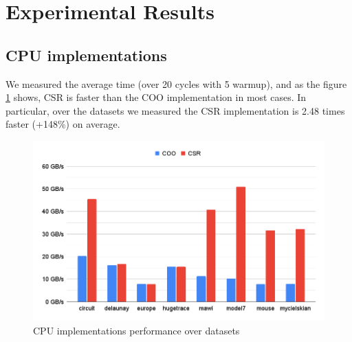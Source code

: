 \documentclass[conference]{IEEEtran}
\begin{document}
\FloatBarrier

\section{Experimental Results}

\subsection{CPU implementations}
We measured the average time (over 20 cycles with 5 warmup), and as the figure \ref{fig:time-cpu-results} shows, CSR is faster than the COO implementation in most cases. In particular, over the datasets we measured the CSR implementation is 2.48 times faster (+148\%) on average.

\begin{figure}[h!]
	\centering
	\includegraphics[width=1\linewidth]{data_images/cpu}
	\caption{CPU implementations performance over datasets}
	\label{fig:time-cpu-results}
\end{figure}
\end{document}
